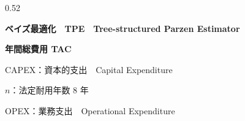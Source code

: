 \begin{frame}[t]

  \vspace*{-0.7ex}
  \begin{columns}[T,onlytextwidth]
    \begin{column}{0.52\textwidth}
      \par
      \vspace{0.18em}
      {\bfseries ベイズ最適化　TPE　Tree-structured Parzen Estimator}\par

      \vspace{0.35em}
      \par
      \vspace{0.18em}
      {\bfseries 年間総費用 {\color{SpRed}TAC}}\par
      \vspace{0.12em}
      {\setlength{\fboxsep}{4pt}}\par
      \vspace{0.13em}
      {\scriptsize\linespread{0.95}\selectfont
       CAPEX：資本的支出　Capital Expenditure\par
       $n$：法定耐用年数 $8$ 年\par
       OPEX：業務支出　Operational Expenditure\par}


\end{column}
\end{columns}
\end{frame}
